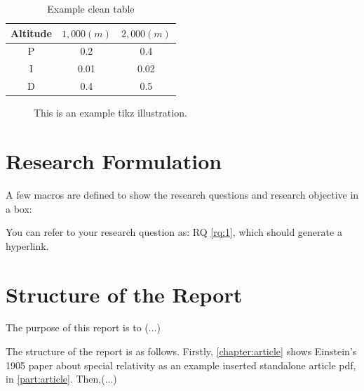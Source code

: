 \begin{table}[ht]
    \centering
    \caption{Example clean table}
    \label{tab:example}
    \begin{tabular}{@{}ccc@{}}
    \toprule
    Altitude & $1,000 (m)$ & $2,000 (m)$ \\
    \midrule
    P &  0.2  & 0.4  \\ 
    I &  0.01 & 0.02 \\
    D &  0.4  & 0.5  \\
    \bottomrule
    \end{tabular}
\end{table}

\begin{figure}[ht]
    \centering
    \caption{This is an example tikz illustration.}
    \label{fig:fig_tikz}
\end{figure}

\newpage
\section{Research Formulation}
\label{section:intro-reseach-questions}

A few macros are defined to show the research questions and research objective in a box:



You can refer to your research question as: RQ \ref{rq:1}, which should generate a hyperlink.

\section{Structure of the Report}
\label{section:intro-report-structure}

The purpose of this report is to (...)

The structure of the report is as follows.
Firstly, \cref{chapter:article} shows Einstein's 1905 paper about special relativity as an example inserted standalone article pdf, in \cref{part:article}.
Then,(...)